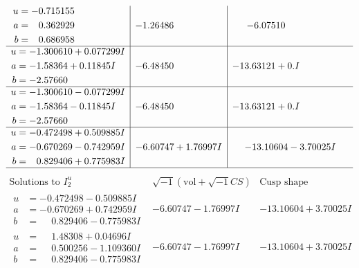 \documentclass[1p]{elsarticle_modified}
\theoremstyle{definition}
\newcommand{\I}{\sqrt{-1}}
\begin{document}
$$\begin{array}{c|c|c}
\begin{aligned}
u &= -0.715155\phantom{ +0.000000I} \\
a &= \phantom{-}0.362929\phantom{ +0.000000I} \\
b &= \phantom{-}0.686958\phantom{ +0.000000I}\end{aligned}
 & -1.26486\phantom{ +0.000000I} & -6.07510\phantom{ +0.000000I} \\ \hline\begin{aligned}
u &= -1.300610 + 0.077299 I \\
a &= -1.58364 + 0.11845 I \\
b &= -2.57660\phantom{ +0.000000I}\end{aligned}
 & -6.48450\phantom{ +0.000000I} & -13.63121 + 0. I\phantom{ +0.000000I} \\ \hline\begin{aligned}
u &= -1.300610 - 0.077299 I \\
a &= -1.58364 - 0.11845 I \\
b &= -2.57660\phantom{ +0.000000I}\end{aligned}
 & -6.48450\phantom{ +0.000000I} & -13.63121 + 0. I\phantom{ +0.000000I} \\ \hline\begin{aligned}
u &= -0.472498 + 0.509885 I \\
a &= -0.670269 - 0.742959 I \\
b &= \phantom{-}0.829406 + 0.775983 I\end{aligned}
 & -6.60747 + 1.76997 I & -13.10604 - 3.70025 I\\
 \hline 
 \end{array}$$\newpage$$\begin{array}{c|c|c}  
\text{Solutions to }I^u_{2}& \I (\text{vol} + \sqrt{-1}CS) & \text{Cusp shape}\\
 \hline 
\begin{aligned}
u &= -0.472498 - 0.509885 I \\
a &= -0.670269 + 0.742959 I \\
b &= \phantom{-}0.829406 - 0.775983 I\end{aligned}
 & -6.60747 - 1.76997 I & -13.10604 + 3.70025 I \\ \hline\begin{aligned}
u &= \phantom{-}1.48308 + 0.04696 I \\
a &= \phantom{-}0.500256 - 1.109360 I \\
b &= \phantom{-}0.829406 - 0.775983 I\end{aligned}
 & -6.60747 - 1.76997 I & -13.10604 + 3.70025 I \\ \hline\begin{aligned}

\end{aligned}
\end{array}$$
\end{document}
